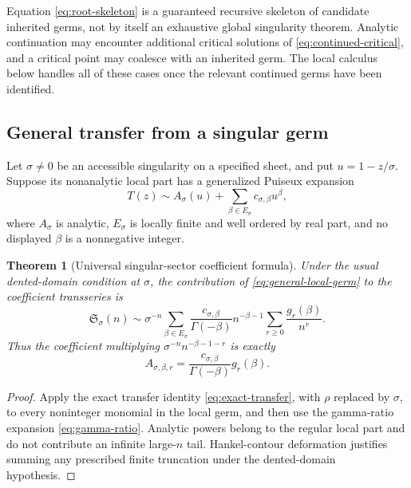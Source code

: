 \documentclass[11pt,oneside]{article}
\numberwithin{equation}{section}
\theoremstyle{plain}
\newtheorem{theorem}{Theorem}[section]
\theoremstyle{definition}
\theoremstyle{remark}
\begin{document}
\begin{warningbox}
Equation \eqref{eq:root-skeleton} is a guaranteed recursive skeleton of
candidate inherited germs, not by itself an exhaustive global singularity
theorem.  Analytic continuation may encounter additional critical solutions
of \eqref{eq:continued-critical}, and a critical point may coalesce with an
inherited germ.  The local calculus below handles all of these cases once
the relevant continued germs have been identified.
\end{warningbox}

\subsection{General transfer from a singular germ}

Let $\sigma\ne0$ be an accessible singularity on a specified sheet, and put
$u=1-z/\sigma$.  Suppose its nonanalytic local part has a generalized
Puiseux expansion
\begin{equation}\label{eq:general-local-germ}
 T(z)\sim A_\sigma(u)+
 \sum_{\beta\in E_\sigma}c_{\sigma,\beta}u^\beta,
\end{equation}
where $A_\sigma$ is analytic, $E_\sigma$ is locally finite and well ordered
by real part, and no displayed $\beta$ is a nonnegative integer.

\begin{theorem}[Universal singular-sector coefficient formula]
\label{thm:general-sector}
Under the usual dented-domain condition at $\sigma$, the contribution of
\eqref{eq:general-local-germ} to the coefficient transseries is
\begin{equation}\label{eq:general-sector}
 \boxed{
 \mathfrak S_\sigma(n)
 \sim \sigma^{-n}
 \sum_{\beta\in E_\sigma}
 \frac{c_{\sigma,\beta}}{\Gamma(-\beta)}
 n^{-\beta-1}
 \sum_{r\ge0}\frac{g_r(\beta)}{n^r}.}
\end{equation}
Thus the coefficient multiplying
$\sigma^{-n}n^{-\beta-1-r}$ is exactly
\begin{equation}\label{eq:general-sector-coeff}
 \boxed{
 A_{\sigma,\beta,r}
 =\frac{c_{\sigma,\beta}}{\Gamma(-\beta)}g_r(\beta).}
\end{equation}
\end{theorem}

\begin{proof}
Apply the exact transfer identity \eqref{eq:exact-transfer}, with $\rho$
replaced by $\sigma$, to every noninteger monomial in the local germ, and
then use the gamma-ratio expansion \eqref{eq:gamma-ratio}.  Analytic powers
belong to the regular local part and do not contribute an infinite
large-$n$ tail.  Hankel-contour deformation justifies summing any prescribed
finite truncation under the dented-domain hypothesis.
\end{proof}
\end{document}
